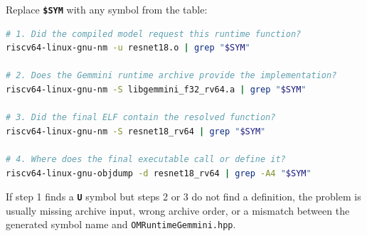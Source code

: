 \documentclass[12pt,a4paper]{article}
\newcommand{\file}[1]{\textcolor{fileteal}{\texttt{#1}}}
\newcommand{\cmd}[1]{\textcolor{argblue}{\texttt{\textbf{#1}}}}
\begin{document}
\begin{infoboxenv}
Replace \cmd{\$SYM} with any symbol from the table:
\begin{lstlisting}[language=bash]
# 1. Did the compiled model request this runtime function?
riscv64-linux-gnu-nm -u resnet18.o | grep "$SYM"

# 2. Does the Gemmini runtime archive provide the implementation?
riscv64-linux-gnu-nm -S libgemmini_f32_rv64.a | grep "$SYM"

# 3. Did the final ELF contain the resolved function?
riscv64-linux-gnu-nm -S resnet18_rv64 | grep "$SYM"

# 4. Where does the final executable call or define it?
riscv64-linux-gnu-objdump -d resnet18_rv64 | grep -A4 "$SYM"
\end{lstlisting}
If step 1 finds a \cmd{U} symbol but steps 2 or 3 do not find a definition, the
problem is usually missing archive input, wrong archive order, or a mismatch
between the generated symbol name and \file{OMRuntimeGemmini.hpp}.
\end{infoboxenv}
\end{document}
